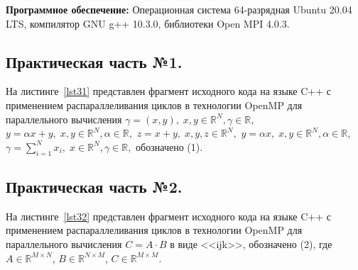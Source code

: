 \textbf{Программное обеспечение:}
Операционная система 64-разрядная Ubuntu 20.04 LTS, компилятор GNU g++ 10.3.0, библиотеки Open MPI 4.0.3.

\subsection*{Практическая часть №1.}
На листинге~\ref{lst31} представлен фрагмент исходного кода на языке C++ с применением распараллеливания циклов в технологии OpenMP для параллельного вычисления 
\ifcase\Zadanie
$\gamma=(x,y), \; x,y\in\mathbb{R}^N, \gamma\in\mathbb{R},$ 
\or 
$y=\alpha x+y, \; x,y\in\mathbb{R}^N, \alpha\in\mathbb{R},$ 
\or 
$z=x+y, \; x,y,z\in\mathbb{R}^N,$ 
\or 
$y=\alpha x, \; x,y\in\mathbb{R}^N, \alpha\in\mathbb{R},$ 
\or 
$\gamma=\sum_{i=1}^{N}x_i, \; x\in\mathbb{R}^N, \gamma\in\mathbb{R},$
\fi
 обозначено (1). 

 


\def\perfFirst{1.5*4}  %
\def\bwFirst{6.4} %
\def\icrossFirst{\perfFirst/\bwFirst} %
\def\perfSecond{1.5*32} %
\def\bwSecond{0.125} %
\def\icrossSecond{\perfSecond/\bwSecond} %





\subsection*{Практическая часть №2.}
На листинге~\ref{lst32} представлен фрагмент исходного кода на языке C++ с применением распараллеливания циклов в технологии OpenMP для параллельного вычисления $C=A\cdot B$ в виде <<ijk>>, обозначено (2), где $A\in \mathbb{R}^{M\times N}$, $B\in \mathbb{R}^{N\times M}$, $C\in \mathbb{R}^{M\times M}$.

 





\newpage
